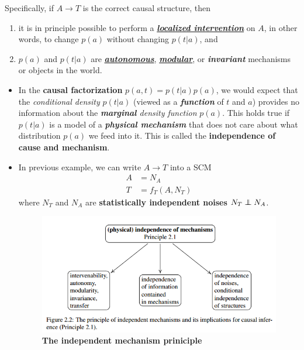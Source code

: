 \documentclass[11pt]{article}
\begin{document}
Specifically, if $A\rightarrow T$ is the correct causal structure, then
\begin{enumerate}
\item it is in principle possible to perform a \underline{\textbf{\emph{localized intervention}}} on $A$, in other
words, to change $p(a)$ without changing $p(t | a)$, and

\item $p(a)$ and $p(t | a)$ are \underline{\textbf{\emph{autonomous}}}, \underline{\textbf{\emph{modular}}}, or \textbf{\emph{invariant}} mechanisms or objects in the world.
\end{enumerate}
\begin{itemize}
\item 
 In the \textbf{causal factorization} $p(a, t) = p(t|a) p(a)$, we would expect that the \emph{conditional density} $p(t|a)$ (viewed as a \emph{\textbf{function}} of $t$ and $a$) provides no information about the \emph{\textbf{marginal} density function} $p(a)$.  This holds true if $p(t|a)$ is a model of a \textbf{\emph{physical mechanism}} that does not care about what distribution $p(a)$ we feed into it. This is called the \textbf{independence of cause and mechanism}.
 
\item In previous example, we can write $A\rightarrow T$ into a SCM
\begin{align*}
A &= N_{A} \\
T &= f_{T}(A, N_{T})
\end{align*} where $N_T$ and $N_{A}$ are \textbf{statistically independent noises} $N_T \indep N_A$. 

\begin{figure}
\begin{minipage}[t]{1\linewidth}
  \centering
  \centerline{\includegraphics[scale = 0.55]{indep_mech.png}}
\end{minipage}
\caption{\footnotesize{\textbf{The independent mechanism priniciple  \citep{peters2017elements}}}}
\label{fig: indep_mech}
\end{figure}



\end{itemize}
\end{document}
